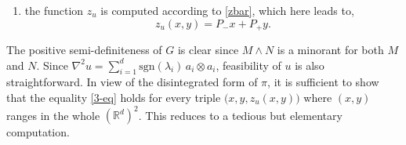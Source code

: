 \documentclass[11pt,letterpaper,reqno]{amsart}
\theoremstyle{definition}
\numberwithin{equation}{section}
\newcommand{\R}{\mathbb{R}}
\newcommand{\Rd}{\R^d}
\newcommand{\PP}{\mathcal{P}}
\begin{document}
{\begin{enumerate}
\item[-] the function $z_u$ is computed according to \eqref{zbar}, which here leads to,
\begin{equation*}
	z_u(x,y) =  P_- x + P_+ y.
\end{equation*}

\end{enumerate}
The positive semi-definiteness of $G$ is clear since $M \wedge N$ is a minorant for both $M$ and $N$.
Since $\nabla^2 u =  \sum_{i=1}^d \mathrm{sgn}(\lambda_i)\, a_i \otimes a_i$, feasibility of $u$ is also straightforward. In view of the disintegrated form of $\pi$, it is sufficient to show that the equality \eqref{3-eq} holds for every triple $\big(x,y,z_u(x,y)\big)$ where $(x,y)$ ranges in the whole $(\Rd)^2$. This reduces to a tedious but elementary computation.


}
\end{document}

